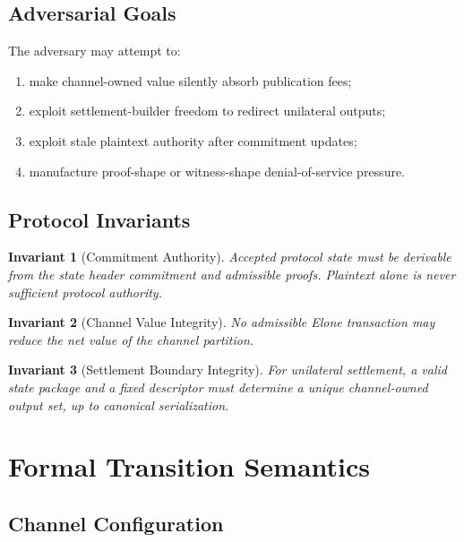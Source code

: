 \documentclass[11pt,a4paper]{article}
\newtheorem{invariant}{Invariant}[section]
\begin{document}
\subsection{Adversarial Goals}

The adversary may attempt to:
\begin{enumerate}
    \item make channel-owned value silently absorb publication fees;
    \item exploit settlement-builder freedom to redirect unilateral outputs;
    \item exploit stale plaintext authority after commitment updates;
    \item manufacture proof-shape or witness-shape denial-of-service pressure.
\end{enumerate}

\subsection{Protocol Invariants}

\begin{invariant}[Commitment Authority]
Accepted protocol state must be derivable from the state header commitment and admissible proofs. Plaintext alone is never sufficient protocol authority.
\end{invariant}

\begin{invariant}[Channel Value Integrity]
No admissible Elone transaction may reduce the net value of the channel partition.
\end{invariant}

\begin{invariant}[Settlement Boundary Integrity]
For unilateral settlement, a valid state package and a fixed descriptor must determine a unique channel-owned output set, up to canonical serialization.
\end{invariant}

\section{Formal Transition Semantics}

\subsection{Channel Configuration}
\end{document}
